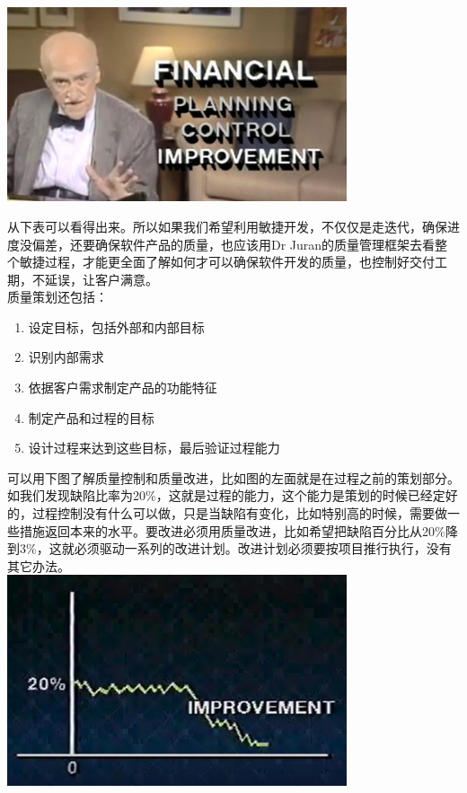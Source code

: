 
\includegraphics[width=10cm]{finAnalogyScreenshot_2022-10-07_212149.jpg}

从下表可以看得出来。所以如果我们希望利用敏捷开发，不仅仅是走迭代，确保进度没偏差，还要确保软件产品的质量，也应该用Dr
Juran的质量管理框架去看整个敏捷过程，才能更全面了解如何才可以确保软件开发的质量，也控制好交付工期，不延误，让客户满意。\\
质量策划还包括：

\begin{enumerate}
\tightlist
\item
  设定目标，包括外部和内部目标
\item
  识别内部需求
\item
  依据客户需求制定产品的功能特征
\item
  制定产品和过程的目标
\item
  设计过程来达到这些目标，最后验证过程能力\\
\end{enumerate}

可以用下图了解质量控制和质量改进，比如图的左面就是在过程之前的策划部分。如我们发现缺陷比率为20\%，这就是过程的能力，这个能力是策划的时候已经定好的，过程控制没有什么可以做，只是当缺陷有变化，比如特别高的时候，需要做一些措施返回本来的水平。要改进必须用质量改进，比如希望把缺陷百分比从20\%降到3\%，这就必须驱动一系列的改进计划。改进计划必须要按项目推行执行，没有其它办法。\\

\includegraphics[width=10cm]{JuranImprovementScreenshot_2022-10-23_211444.jpg}


